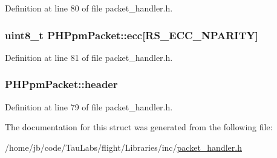 \-Definition at line 80 of file packet\-\_\-handler.\-h.

\hypertarget{struct_p_h_ppm_packet_a4cd9aaabbc588410a6ccc2d333fc224a}{
\subsubsection[{ecc}]{\setlength{\rightskip}{0pt plus 5cm}uint8\-\_\-t {\bf \-P\-H\-Ppm\-Packet\-::ecc}\mbox{[}\-R\-S\-\_\-\-E\-C\-C\-\_\-\-N\-P\-A\-R\-I\-T\-Y\mbox{]}}}\label{struct_p_h_ppm_packet_a4cd9aaabbc588410a6ccc2d333fc224a}


\-Definition at line 81 of file packet\-\_\-handler.\-h.

\hypertarget{struct_p_h_ppm_packet_a6dbe9e28bb634aadd35b5c4501589532}{
\subsubsection[{header}]{ {\bf \-P\-H\-Ppm\-Packet\-::header}}}\label{struct_p_h_ppm_packet_a6dbe9e28bb634aadd35b5c4501589532}


\-Definition at line 79 of file packet\-\_\-handler.\-h.



\-The documentation for this struct was generated from the following file\-:\begin{DoxyCompactItemize}
\item 
/home/jb/code/\-Tau\-Labs/flight/\-Libraries/inc/\hyperlink{packet__handler_8h}{packet\-\_\-handler.\-h}\end{DoxyCompactItemize}
